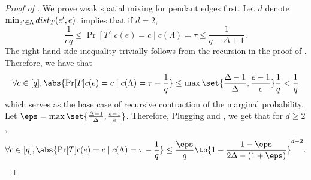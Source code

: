 \begin{proof}[Proof of ]
    We prove weak spatial mixing for pendant edges first.
    Let $d$ denote $\min_{e'\in \Lambda} \-{dist}_{T}(e',e)$.
     implies that if $d = 2$, 
    $$
        \frac{1}{eq}\leq \Pr[T]{c(e) = c\mid c(\Lambda) = \tau} \leq \frac 1{q-\Delta + 1}.
    $$
    The right hand side inequality trivially follows from the recursion in the proof of .
    Therefore, we have that
    \begin{align}\label{eq:base_case_WSM}
        \forall c\in [q], \abs{\Pr[T]{c(e) = c\mid c(\Lambda) = \tau} - \frac 1q} \leq \max\set{\frac{\Delta - 1}{\Delta}, \frac {e - 1}e}\frac 1q < \frac 1q
    \end{align}
    which serves as the base case of recursive contraction of the marginal probability.
    Let $\eps = \max\set{\frac{\Delta - 1}{\Delta}, \frac {e - 1}e}$.
    Therefore, Plugging  and , we get that for $d\geq 2$,
    \begin{align}\label{eq:WSM_decay}
        \forall c\in [q], \abs{\Pr[T]{c(e) = c\mid c(\Lambda) = \tau} - \frac 1q} \leq \frac{\eps}{q} \tp{1 - \frac{1 - \eps}{2\Delta - (1+\eps)}}^{d-2}.
    \end{align}


\end{proof}
